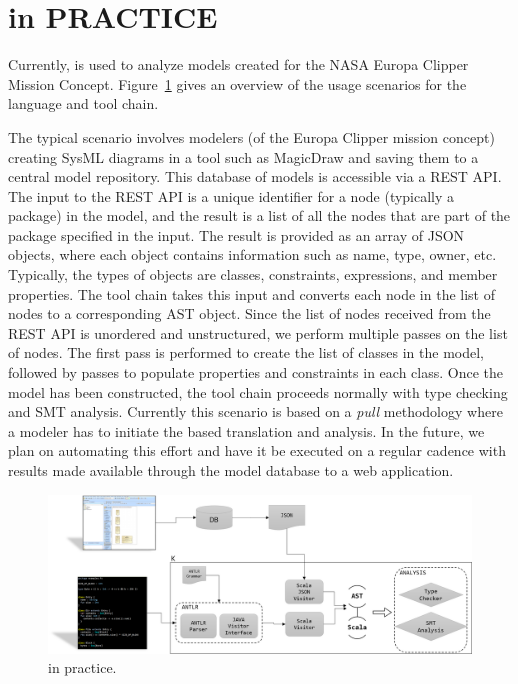 \section{\Klang{} in PRACTICE}
\label{sec:usage}

Currently, \Klang{} is used to analyze models created for the NASA
Europa Clipper Mission Concept. Figure~\ref{fig:k} gives an overview
of the usage scenarios for the \Klang{} language and tool chain.

The typical scenario involves modelers (of the Europa Clipper mission
concept) creating SysML diagrams in a tool such as MagicDraw and
saving them to a central model repository. This database of models is
accessible via a REST API. The input to the REST API is a unique
identifier for a node (typically a \sysml{} package) in the model, and
the result is a list of all the nodes that are part of the package
specified in the input. The result is provided as an array of JSON
objects, where each object contains information such as name, type,
owner, etc. Typically, the types of objects are classes, constraints,
expressions, and member properties. The \Klang{} tool chain takes this
input and converts each node in the list of nodes to a corresponding
\Klang{} AST object. Since the list of nodes received from the REST
API is unordered and unstructured, we perform multiple passes on the
list of nodes. The first pass is performed to create the list of
classes in the model, followed by passes to populate properties and
constraints in each class. Once the \Klang{} model has been
constructed, the \Klang{} tool chain proceeds normally with type
checking and SMT analysis. Currently this scenario is based on a {\em
  pull} methodology where a modeler has to initiate the \Klang{} based
translation and analysis. In the future, we plan on automating this
effort and have it be executed on a regular cadence with results made
available through the model database to a web application.

\begin{figure}
  \centering
  \includegraphics[scale=0.49]{K.png}
  \caption{\Klang{} in practice.}
  \label{fig:k}
\end{figure}



